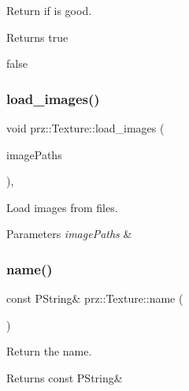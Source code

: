 Return if is good. 

\begin{DoxyReturn}{Returns}
true 

false 
\end{DoxyReturn}
\mbox{\label{classprz_1_1_texture_a0687ed315cff544d82e748621b75bf19}} 
\subsubsection{\texorpdfstring{load\_images()}{load\_images()}}
{\footnotesize\ttfamily void prz\+::\+Texture\+::load\+\_\+images (\begin{DoxyParamCaption}\item[{P\+Buffer$<$ P\+String $>$ \&}]{image\+Paths }\end{DoxyParamCaption})\hspace{0.3cm}{\ttfamily [protected]}, {\ttfamily [virtual]}}



Load images from files. 


\begin{DoxyParams}{Parameters}
{\em image\+Paths} & \\
\hline
\end{DoxyParams}
\mbox{\label{classprz_1_1_texture_ad6163bf48f820adc4665d227bcd5c258}} 
\subsubsection{\texorpdfstring{name()}{name()}}
{\footnotesize\ttfamily const P\+String\& prz\+::\+Texture\+::name (\begin{DoxyParamCaption}{ }\end{DoxyParamCaption})\hspace{0.3cm}{\ttfamily [inline]}}



Return the name. 

\begin{DoxyReturn}{Returns}
const P\+String\& 
\end{DoxyReturn}
\mbox{\label{classprz_1_1_texture_a75b9d1ba9920727d99e4c167c900fa32}} 
